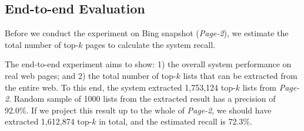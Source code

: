 
\subsection{End-to-end Evaluation}
\label{sec:bigdata}

Before we conduct the experiment on Bing snapshot (\emph{Page-2}),
we estimate the total number of top-$k$ pages
to calculate the system recall.


The end-to-end experiment aims to show: 1) the overall system performance on
real web pages; and 2) the total number of top-$k$ lists that can be extracted
from the entire web.
To this end, the system extracted 1,753,124 top-$k$ lists from {\em Page-2}.
Random sample of 1000 lists from the extracted result
has a precision of 92.0\%. If we project this result up to the whole of
{\em Page-2}, we should have extracted 1,612,874 top-$k$ in total,
and the estimated recall is 72.3\%.

